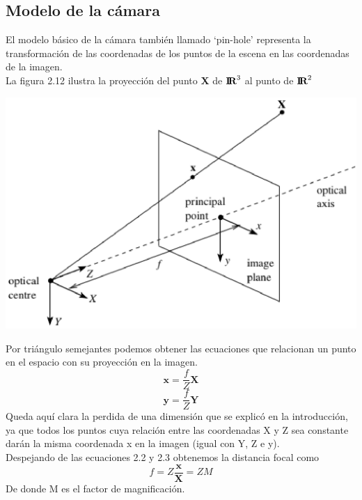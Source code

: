 \subsection{Modelo de la cámara}
El modelo básico de la cámara también llamado
‘pin-hole’ representa la transformación de las
coordenadas de los puntos de la escena en las
coordenadas de la imagen. \cite{Paper::Ricolfe2008}\\
La figura 2.12 ilustra la proyección del punto \textbf{X} de ${\textbf{I\!R}^3}$ al punto 
de ${\textbf{I\!R}^2}$
\begin{center}
	\includegraphics[width=1.0 \textwidth]{Contenido/Cuerpo/Capitulo2/Fig19.eps}
	\label{fig:MarcoTeorico:Fig11}
\end{center}
Por triángulo semejantes podemos obtener las ecuaciones que relacionan un punto en el espacio con
su proyección en la imagen.
\begin{equation}
	\textbf{x} = \frac{f}{Z}\textbf{X}
\end{equation}
\begin{equation}
	\textbf{y} = \frac{f}{Z}\textbf{Y}
\end{equation}
Queda aquí clara la perdida de una dimensión que se explicó en la introducción,
ya que todos los puntos cuya relación entre las coordenadas X y Z sea constante darán la
misma coordenada x en la imagen (igual con Y, Z e y).\cite{Book:Jose2005}\\
Despejando de las ecuaciones 2.2 y 2.3 obtenemos la distancia focal como
\begin{equation}
	f = Z \frac{\textbf{x}}{\textbf{X}}=ZM
\end{equation}
De donde M es el factor de magnificación.\\
